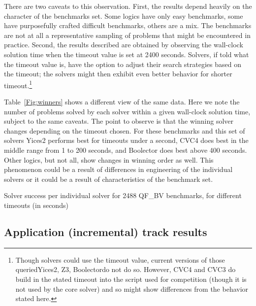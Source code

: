 \documentclass[twoside,11pt]{article}
\begin{document}
There are two caveats to this observation. First, the results depend heavily on the character of the benchmarks set. Some logics have only easy benchmarks, some have purposefully crafted difficult benchmarks, others are a mix. The benchmarks are not at all a representative sampling of problems that might be encountered in practice.  Second, the results described are obtained by observing the wall-clock solution time when the timeout value is set at 2400 seconds. Solvers, if told what the timeout value is, have the option to adjust their search strategies based on the timeout; the solvers might then exhibit even better behavior for shorter timeout.\footnote{Though solvers could use the timeout value, current versions of those queried\textemdash Yices2, Z3, Boolector\textemdash do not do so. However, CVC4 and CVC3 do build in the stated timeout into the script used for competition (though it is not used by the core solver) and so might show differences from the behavior stated here.}

Table~\ref{Fig:winners} shows a different view of the same data. Here we note the number of problems solved by each solver within a given wall-clock solution time, subject to the same caveats. The point to observe is that the winning solver changes depending on the timeout chosen. For these benchmarks and this set of solvers Yices2 performs best for timeouts under a second, CVC4 does best in the middle range from 1 to 200 seconds, and Boolector does best above 400 seconds. Other logics, but not all, show changes in winning order as well. This phenomenon could be a result of differences in engineering of the individual solvers or it could be a result of characteristics of the benchmark set.

%

\begin{table}
\centering

\caption{Solver success per individual solver for 2488 QF\_BV benchmarks, for different timeouts (in seconds)}
\label{Fig:winners}
\end{table}

\subsection{Application (incremental) track results}
\label{sec:application-results}
\end{document}
